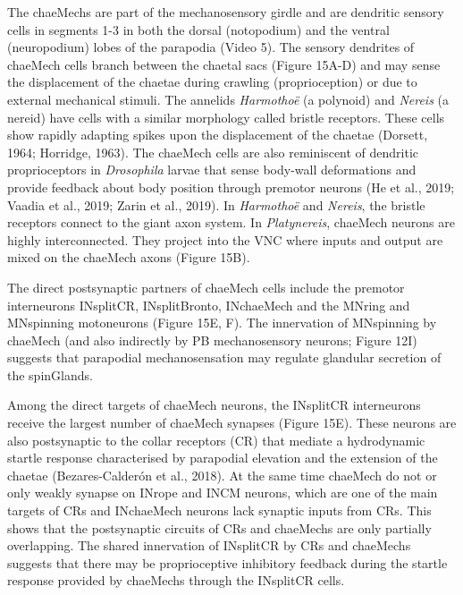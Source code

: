 \documentclass[
  11pt,
]{article}
\begin{document}
The chaeMechs are part of the mechanosensory girdle and are dendritic
sensory cells in segments 1-3 in both the dorsal (notopodium) and the
ventral (neuropodium) lobes of the parapodia (Video 5). The sensory
dendrites of chaeMech cells branch between the chaetal sacs (Figure
15A-D) and may sense the displacement of the chaetae during crawling
(proprioception) or due to external mechanical stimuli. The annelids
\emph{Harmothoë} (a polynoid) and \emph{Nereis} (a nereid) have cells
with a similar morphology called bristle receptors. These cells show
rapidly adapting spikes upon the displacement of the chaetae (Dorsett,
1964; Horridge, 1963). The chaeMech cells are also reminiscent of
dendritic proprioceptors in \emph{Drosophila} larvae that sense
body-wall deformations and provide feedback about body position through
premotor neurons (He et al., 2019; Vaadia et al., 2019; Zarin et al.,
2019). In \emph{Harmothoë} and \emph{Nereis}, the bristle receptors
connect to the giant axon system. In \emph{Platynereis}, chaeMech
neurons are highly interconnected. They project into the VNC where
inputs and output are mixed on the chaeMech axons (Figure 15B).

The direct postsynaptic partners of chaeMech cells include the premotor
interneurons INsplitCR, INsplitBronto, INchaeMech and the MNring and
MNspinning motoneurons (Figure 15E, F). The innervation of MNspinning by
chaeMech (and also indirectly by PB mechanosensory neurons; Figure 12I)
suggests that parapodial mechanosensation may regulate glandular
secretion of the spinGlands.

Among the direct targets of chaeMech neurons, the INsplitCR interneurons
receive the largest number of chaeMech synapses (Figure 15E). These
neurons are also postsynaptic to the collar receptors (CR) that mediate
a hydrodynamic startle response characterised by parapodial elevation
and the extension of the chaetae (Bezares-Calderón et al., 2018). At the
same time chaeMech do not or only weakly synapse on INrope and INCM
neurons, which are one of the main targets of CRs and INchaeMech neurons
lack synaptic inputs from CRs. This shows that the postsynaptic circuits
of CRs and chaeMechs are only partially overlapping. The shared
innervation of INsplitCR by CRs and chaeMechs suggests that there may be
proprioceptive inhibitory feedback during the startle response provided
by chaeMechs through the INsplitCR cells.
\end{document}
